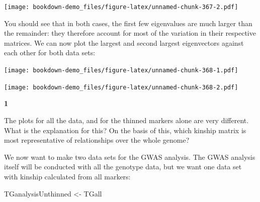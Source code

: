 \documentclass[
]{book}
\makeatletter
\newenvironment{Shaded}{\begin{snugshade}}{\end{snugshade}}
\newcommand{\DecValTok}[1]{\textcolor[rgb]{0.00,0.00,0.81}{#1}}
\newcommand{\FunctionTok}[1]{\textcolor[rgb]{0.00,0.00,0.00}{#1}}
\newcommand{\NormalTok}[1]{#1}
\newcommand{\OtherTok}[1]{\textcolor[rgb]{0.56,0.35,0.01}{#1}}
\newcommand{\SpecialCharTok}[1]{\textcolor[rgb]{0.00,0.00,0.00}{#1}}
\newenvironment{kframe}{%
\medskip{}
\setlength{\fboxsep}{.8em}
 \def\at@end@of@kframe{}%
 \ifinner\ifhmode%
  \def\at@end@of@kframe{\end{minipage}}%
  \begin{minipage}{\columnwidth}%
 \fi\fi%
 \def\FrameCommand##1{\hskip\@totalleftmargin \hskip-\fboxsep
 \colorbox{shadecolor}{##1}\hskip-\fboxsep
     \hskip-\linewidth \hskip-\@totalleftmargin \hskip\columnwidth}%
 \MakeFramed {\advance\hsize-\width
   \@totalleftmargin\z@ \linewidth\hsize
   \@setminipage}}%
 {\par\unskip\endMakeFramed%
 \at@end@of@kframe}
\newenvironment{rmdblock}[1]
  {
  \begin{itemize}
  \renewcommand{\labelitemi}{
    \raisebox{-.7\height}[0pt][0pt]{
      {\setkeys{Gin}{width=3em,keepaspectratio}\texttt{[image: images/\#1]}}
    }
  }
  \setlength{\fboxsep}{1em}
  \begin{kframe}
  \item
  }
  {
  \end{kframe}
  \end{itemize}
  }
\newenvironment{rmdquiz}
  {\begin{rmdblock}{quiz}}
  {\end{rmdblock}}
\makeatother
\begin{document}
\texttt{[image: bookdown-demo\_files/figure-latex/unnamed-chunk-367-2.pdf]}

You should see that in both cases, the first few eigenvalues are much larger than the remainder: they therefore account for most of the variation in their respective matrices. We can now plot the largest and second largest eigenvectors against each other for both data sets:

\begin{Shaded}
\end{Shaded}

\texttt{[image: bookdown-demo\_files/figure-latex/unnamed-chunk-368-1.pdf]}

\begin{Shaded}
\end{Shaded}

\texttt{[image: bookdown-demo\_files/figure-latex/unnamed-chunk-368-2.pdf]}

\begin{rmdquiz}
\textbf{1}

The plots for all the data, and for the thinned markers alone are very different. What is the explanation for this? On the basis of this, which kinship matrix is most representative of relationships over the whole genome?
\end{rmdquiz}

We now want to make two data sets for the GWAS analysis. The GWAS analysis itself will be conducted with all the genotype data, but we want one data set with kinship calculated from all markers:

\begin{Shaded}
\begin{Highlighting}[]
\NormalTok{TGanalysisUnthinned }\OtherTok{\textless{}{-}}\NormalTok{ TGall}
\end{Highlighting}
\end{Shaded}
\end{document}
